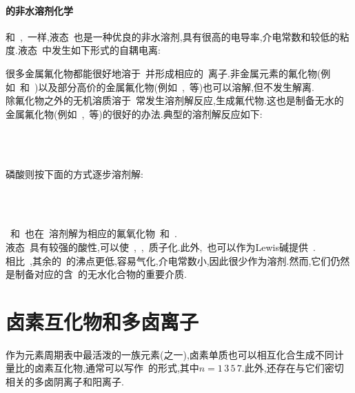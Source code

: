 \documentclass{ctexbook}
\begin{document}
\paragraph{的非水溶剂化学}
和~,~一样,液态~也是一种优良的非水溶剂,具有很高的电导率,介电常数和较低的粘度.液态~中发生如下形式的自耦电离:
\begin{tightcenter}
\end{tightcenter}
很多金属氟化物都能很好地溶于~并形成相应的~离子.非金属元素的氟化物(例如~和~)以及部分高价的金属氟化物(例如~,~等)也可以溶解,但不发生解离.\\
\indent 除氟化物之外的无机溶质溶于~常发生溶剂解反应,生成氟代物.这也是制备无水的金属氟化物(例如~,~等)的很好的办法.典型的溶剂解反应如下:
\begin{tightcenter}
    \\
    \\
\end{tightcenter}
磷酸则按下面的方式逐步溶剂解:
\begin{tightcenter}
    \\
    \\
\end{tightcenter}
~和~也在~溶剂解为相应的氟氧化物~和~.\\
\indent 液态~具有较强的酸性,可以使~,~,~质子化.此外,~也可以作为Lewis碱提供~.\\
\indent 相比~,其余的~的沸点更低,容易气化,介电常数小,因此很少作为溶剂.然而,它们仍然是制备对应的含~的无水化合物的重要介质.
\section{卤素互化物和多卤离子}
作为元素周期表中最活泼的一族元素(之一),卤素单质也可以相互化合生成不同计量比的卤素互化物,通常可以写作~的形式,其中$n=1\,3\,5\,7$.此外,还存在与它们密切相关的多卤阴离子和阳离子.
\end{document}
